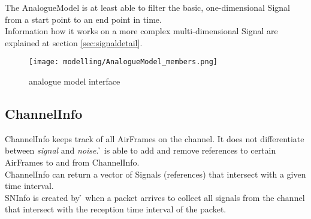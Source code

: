 %

The AnalogueModel is at least able to filter the basic, one-dimensional Signal
from a start point to an end point in time.\\

Information how it works on a more complex multi-dimensional Signal are
explained at section \ref{sec:signaldetail}.
 
\begin{figure}[H]
 \centering
 \texttt{[image: modelling/AnalogueModel\_members.png]}
 \caption{analogue model interface}
 \label{fig: analogue model interface}
\end{figure}
%





\subsection{ChannelInfo}

ChannelInfo keeps track of all AirFrames on the channel. It does not
differentiate between \textit{signal} and \textit{noise}. \h{\bp} is able to
add and remove references to certain AirFrames to and from ChannelInfo.\\
ChannelInfo can return a vector of Signals (references) that intersect with a
given time interval.\\
SNInfo is created by \h{\bp} when a packet arrives to collect all signals from
the channel that intersect with the reception time interval of the packet.

